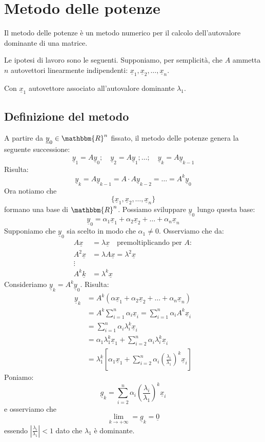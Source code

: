 \documentclass[12pt]{report}
\begin{document}
\section{Metodo delle potenze}
Il metodo delle potenze è un metodo numerico per il calcolo dell'autovalore dominante di una matrice.

Le ipotesi di lavoro sono le seguenti. Supponiamo, per semplicità, che $A$ ammetta $n$ autovettori linearmente indipendenti: $\underline{x}_1, \underline{x}_2, \dots, \underline{x}_n$.

Con $\underline{x}_1$ autovettore associato all'autovalore dominante $\lambda_1$.
\subsection{Definizione del metodo}
A partire da $\underline{y}_0 \in \mathbbm{R}^n$ fissato, il metodo delle potenze genera la seguente successione:
\[
\underline{y}_1 = A\underline{y}_0; \quad \underline{y}_2 = A\underline{y}_1; \dots; \quad \underline{y}_k = A\underline{y}_{k-1}
\]
Risulta:
\[
\underline{y}_k = A\underline{y}_{k-1} = A \cdot A \underline{y}_{k-2} = \dots = A^k\underline{y}_0
\]
Ora notiamo che
\[
\{\underline{x}_1, \underline{x}_2, \dots, \underline{x}_n\}
\]
formano una base di $\mathbbm{R}^n$. Possiamo sviluppare $\underline{y}_0$ lungo questa base:
\[
\underline{y}_0 = \alpha_1\underline{x}_1 + \alpha_2\underline{x}_2 + \dots + \alpha_n\underline{x}_n
\]
Supponiamo che $\underline{y}_0$ sia scelto in modo che $\alpha_1 \neq 0$. Osserviamo che da:
\begin{align*}
	A\underline{x} &= \lambda\underline{x} \quad \text{premoltiplicando per $A$}: \\
	A^2\underline{x} &= \lambda A\underline{x} = \lambda^2\underline{x} \\
	\vdots \\
	A^k\underline{k} &= \lambda^k\underline{x}
\end{align*}
Consideriamo $\underline{y}_k = A^k\underline{y}_0$. Risulta:
\begin{align*}
	\underline{y}_k &= A^k(\alpha\underline{x}_1 + \alpha_2\underline{x}_2 + \dots + \alpha_n\underline{x}_n) \\
	&= A^k\displaystyle\sum_{i=1}^{n}\alpha_i\underline{x}_i = \displaystyle\sum_{i=1}^{n}\alpha_iA^k\underline{x}_i \\
	&= \displaystyle\sum_{i=1}^{n}\alpha_i\lambda_i^k\underline{x}_i \\
	&= \alpha_1\lambda_1^k\underline{x}_1 + \displaystyle\sum_{i=2}^{n}\alpha_i\lambda_i^k\underline{x}_i \\
	&= \lambda_1^k\left[\alpha_1\underline{x}_1 + \displaystyle\sum_{i=2}^{n}\alpha_i\left(\frac{\lambda_i}{\lambda_1}\right)^k\underline{x}_i\right]
\end{align*}
Poniamo:
\[
\underline{g}_k = \displaystyle\sum_{i=2}^{n}\alpha_i\left(\frac{\lambda_i}{\lambda_1}\right)^k\underline{x}_i
\]
e osserviamo che
\[
\lim\limits_{k \to +\infty} = \underline{g}_k = \underline{0}
\]
essendo $\left|\frac{\lambda_i}{\lambda_1}\right| < 1$ dato che $\lambda_1$ è dominante.
\end{document}

